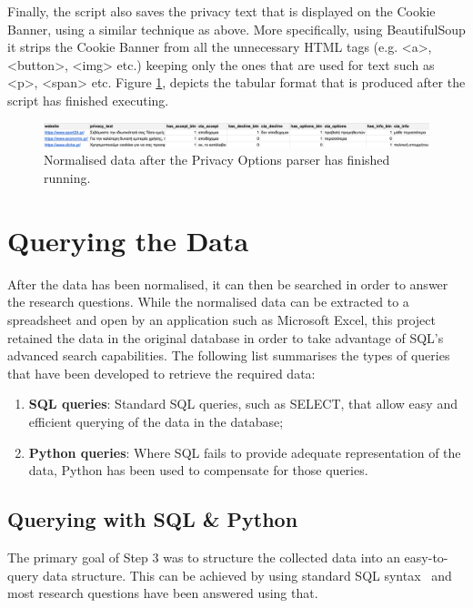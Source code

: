 \documentclass[../main.tex]{subfiles}
\begin{document}
Finally, the script also saves the privacy text that is displayed on the Cookie Banner, using a similar technique as above. More specifically, using BeautifulSoup it strips the Cookie Banner from all the unnecessary HTML tags (e.g. {\selectfont <a>}, {\selectfont <button>}, {\selectfont <img>} etc.) keeping only the ones that are used for text such as {\selectfont <p>}, {\selectfont <span>} etc. Figure \ref{fig:impl_privacy_options_normalised}, depicts the tabular format that is produced after the script has finished executing. 

\begin{figure}[ht]
    \centering
    \includegraphics[width=\textwidth]{images/implementation/normalised_data.png}
    \caption{Normalised data after the Privacy Options parser has finished running.}
    \label{fig:impl_privacy_options_normalised}
\end{figure}

\section{Querying the Data}
After the data has been normalised, it can then be searched in order to answer the research questions. While the normalised data can be extracted to a spreadsheet and open by an application such as Microsoft Excel, this project retained the data in the original database in order to take advantage of SQL’s advanced search capabilities. The following list summarises the types of queries that have been developed to retrieve the required data: 

\begin{enumerate}
    \item \textbf{SQL queries}: Standard SQL queries, such as SELECT, that allow easy and efficient querying of the data in the database;
    
    \item \textbf{Python queries}: Where SQL fails to provide adequate representation of the data, Python has been used to compensate for those queries.
\end{enumerate}

\subsection{Querying with SQL \& Python}
The primary goal of Step 3 was to structure the collected data into an easy-to-query data structure. This can be achieved by using standard SQL syntax~\cite{bowman1996practical} and most research questions have been answered using that. 
\end{document}
